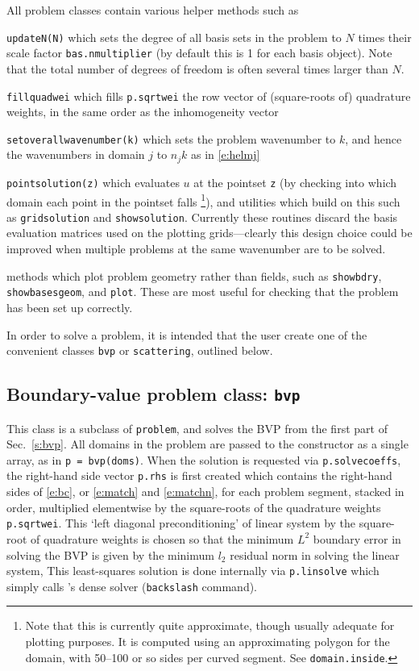 \documentclass[12pt]{article}
\begin{document}
All problem classes contain various helper methods such as
\bi
\item
{\tt updateN(N)} which sets the degree of all basis sets in the
problem to $N$ times their scale factor {\tt bas.nmultiplier}
(by default this is 1 for each basis object).
Note that the total number of degrees of freedom is often several times
larger than $N$.
\item
{\tt fillquadwei} which fills {\tt p.sqrtwei} the row vector of
(square-roots of)
quadrature weights, in the same order as the inhomogeneity vector
\item {\tt setoverallwavenumber(k)} which sets the problem wavenumber to $k$,
and hence the wavenumbers in domain $j$ to $n_j k$ as in \eqref{e:helmj}
\item {\tt pointsolution(z)} which evaluates $u$ at the pointset {\tt z}
(by checking into which domain each point in the pointset falls%
  \footnote{Note that this is currently quite approximate, though usually
    adequate for plotting purposes. It is computed using an approximating
    polygon for the domain, with 50--100 or so sides per curved segment.
    See {\tt domain.inside}.}),
and utilities which build on this such as {\tt gridsolution} and
{\tt showsolution}. Currently these routines discard the
basis evaluation matrices used on the plotting grids---clearly 
this design choice could be improved when multiple problems at the
same wavenumber are to be solved.
\item methods which plot problem geometry rather than fields, such as
{\tt showbdry}, {\tt showbasesgeom}, and {\tt plot}.
These are most useful for checking that the problem has been set up correctly.
\ei

In order to solve a problem, it is intended that the user create one of the
convenient classes {\tt bvp} or {\tt scattering}, outlined below.


\subsection{Boundary-value problem class: {\tt bvp}}

This class is a subclass of {\tt problem}, and solves
the BVP from the first part of Sec.~\ref{s:bvp}.
All domains in the problem are passed to the constructor
as a single array, as in {\tt p = bvp(doms)}.
When the solution is requested via {\tt p.solvecoeffs}, 
the right-hand side vector {\tt p.rhs} is first created which
contains the right-hand sides of \eqref{e:bc}, or \eqref{e:match} and
\eqref{e:matchn}, for each problem segment, stacked in order,
multiplied elementwise
by the square-roots of the quadrature weights {\tt p.sqrtwei}.
This `left diagonal preconditioning' of linear system
by the square-root of quadrature weights is chosen so that
the minimum $L^2$ boundary error in solving the BVP is
given by the minimum $l_2$ residual norm in solving the linear system,
This least-squares solution is done internally via {\tt p.linsolve}
which simply calls \matlab's dense solver ({\tt backslash} command).
\end{document}
